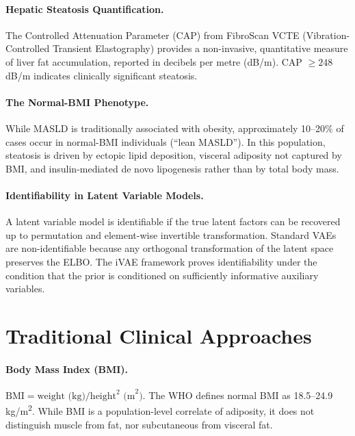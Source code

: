 \documentclass[12pt,a4paper,oneside]{report}
\begin{document}
\paragraph{Hepatic Steatosis Quantification.} The Controlled Attenuation Parameter (CAP) from FibroScan VCTE (Vibration-Controlled Transient Elastography) provides a non-invasive, quantitative measure of liver fat accumulation, reported in decibels per metre (dB/m). CAP $\geq 248$\,dB/m indicates clinically significant steatosis.

\paragraph{The Normal-BMI Phenotype.} While MASLD is traditionally associated with obesity, approximately 10--20\% of cases occur in normal-BMI individuals (``lean MASLD''). In this population, steatosis is driven by ectopic lipid deposition, visceral adiposity not captured by BMI, and insulin-mediated de novo lipogenesis rather than by total body mass.

\paragraph{Identifiability in Latent Variable Models.} A latent variable model is identifiable if the true latent factors can be recovered up to permutation and element-wise invertible transformation. Standard VAEs are non-identifiable because any orthogonal transformation of the latent space preserves the ELBO. The iVAE framework \citep{khemakhem2020} proves identifiability under the condition that the prior is conditioned on sufficiently informative auxiliary variables.

\section{Traditional Clinical Approaches}

\paragraph{Body Mass Index (BMI).} $\text{BMI} = \text{weight (kg)} / \text{height}^2 \text{ (m}^2\text{)}$. The WHO defines normal BMI as 18.5--24.9\,kg/m\textsuperscript{2}. While BMI is a population-level correlate of adiposity, it does not distinguish muscle from fat, nor subcutaneous from visceral fat.
\end{document}
